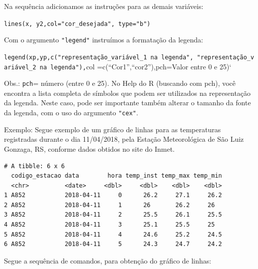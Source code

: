 \documentclass[12pt,portuguese,oneside]{book}
\newenvironment{Shaded}{\begin{snugshade}}{\end{snugshade}}
\newcommand{\KeywordTok}[1]{\textcolor[rgb]{0.13,0.29,0.53}{\textbf{#1}}}
\newcommand{\DataTypeTok}[1]{\textcolor[rgb]{0.13,0.29,0.53}{#1}}
\newcommand{\StringTok}[1]{\textcolor[rgb]{0.31,0.60,0.02}{#1}}
\newcommand{\OtherTok}[1]{\textcolor[rgb]{0.56,0.35,0.01}{#1}}
\newcommand{\NormalTok}[1]{#1}
\begin{document}
Na sequência adicionamos as instruções para as demais variáveis:

\texttt{lines(x,\ y2,col="cor\_desejada",\ type="b")}

Com o argumento \texttt{"legend"} instruímos a formatação da legenda:

\texttt{legend(xp,yp,c("representação\_variável\_1\ na\ legenda",\ "representação\_variável\_2\ na\ legenda"),}col
=c(``Cor1'',``cor2''),pch=Valor entre 0 e 25)`

Obs.: \texttt{pch}= número (entre 0 e 25). No Help do R (buscando com
pch), você encontra a lista completa de símbolos que podem ser
utilizados na representação da legenda. Neste caso, pode ser importante
também alterar o tamanho da fonte da legenda, com o uso do argumento
\texttt{"cex"}.

Exemplo: Segue exemplo de um gráfico de linhas para as temperaturas
registradas durante o dia 11/04/2018, pela Estação Meteorológica de São
Luiz Gonzaga, RS, conforme dados obtidos no site do Inmet.

\begin{Shaded}
\end{Shaded}

\begin{verbatim}
# A tibble: 6 x 6
  codigo_estacao data        hora temp_inst temp_max temp_min
  <chr>          <date>     <dbl>     <dbl>    <dbl>    <dbl>
1 A852           2018-04-11     0      26.2     27.1     26.2
2 A852           2018-04-11     1      26       26.2     26  
3 A852           2018-04-11     2      25.5     26.1     25.5
4 A852           2018-04-11     3      25.1     25.5     25  
5 A852           2018-04-11     4      24.6     25.2     24.5
6 A852           2018-04-11     5      24.3     24.7     24.2
\end{verbatim}

Segue a sequência de comandos, para obtenção do gráfico de linhas:
\end{document}
